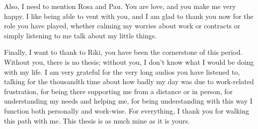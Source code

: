 Also, I need to mention Rosa and Pau. You are love, and you make me very happy. I like being able to vent with you, and I am glad to thank you now for the role you have played, whether calming my worries about work or contracts or simply listening to me talk about my little things.

\thispagestyle{empty}

Finally, I want to thank to Riki, you have been the cornerstone of this period. Without you, there is no thesis; without you, I don't know what I would be doing with my life. I am very grateful for the very long audios you have listened to, talking for the thousandth time about how badly my day was due to work-related frustration, for being there supporting me from a distance or in person, for understanding my needs and helping me, for being understanding with this way I function both personally and work-wise. For everything, I thank you for walking this path with me. This thesis is as much mine as it is yours.


\vfill